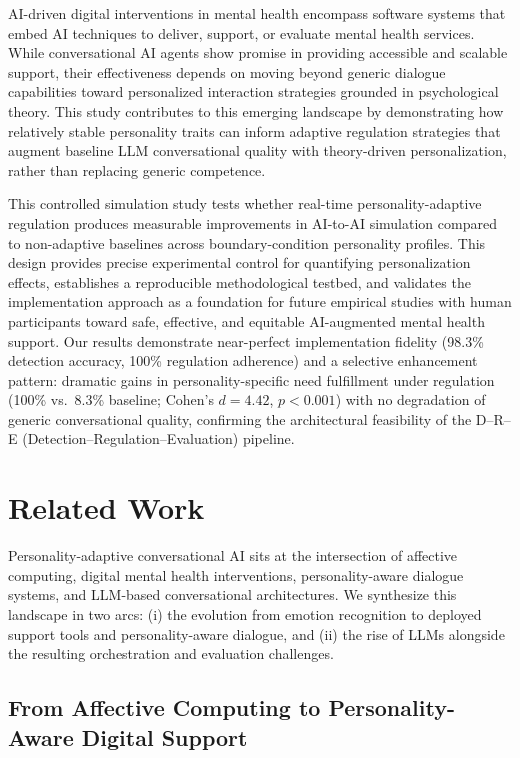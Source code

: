 \documentclass[apajournal,article,submit,moreauthors]{Definitions/mdpi}
\begin{document}
AI-driven digital interventions in mental health encompass software systems that embed AI techniques to deliver, support, or evaluate mental health services. While conversational AI agents show promise in providing accessible and scalable support, their effectiveness depends on moving beyond generic dialogue capabilities toward personalized interaction strategies grounded in psychological theory. This study contributes to this emerging landscape by demonstrating how relatively stable personality traits can inform adaptive regulation strategies that augment baseline LLM conversational quality with theory-driven personalization, rather than replacing generic competence.

This controlled simulation study tests whether real-time personality-adaptive regulation produces measurable improvements in AI-to-AI simulation compared to non-adaptive baselines across boundary-condition personality profiles. This design provides precise experimental control for quantifying personalization effects, establishes a reproducible methodological testbed, and validates the implementation approach as a foundation for future empirical studies with human participants toward safe, effective, and equitable AI-augmented mental health support. Our results demonstrate near-perfect implementation fidelity (98.3\% detection accuracy, 100\% regulation adherence) and a selective enhancement pattern: dramatic gains in personality-specific need fulfillment under regulation (100\% vs.~8.3\% baseline; Cohen's $d = 4.42$, $p < 0.001$) with no degradation of generic conversational quality, confirming the architectural feasibility of the D--R--E (Detection--Regulation--Evaluation) pipeline.

\section{Related Work}\label{related-work}

Personality-adaptive conversational AI sits at the intersection of affective computing, digital mental health interventions, personality-aware dialogue systems, and LLM-based conversational architectures. We synthesize this landscape in two arcs: (i) the evolution from emotion recognition to deployed support tools and personality-aware dialogue, and (ii) the rise of LLMs alongside the resulting orchestration and evaluation challenges.

\subsection{From Affective Computing to Personality-Aware Digital Support}\label{from-affective-computing-to-personality-aware-digital-support}
\end{document}
